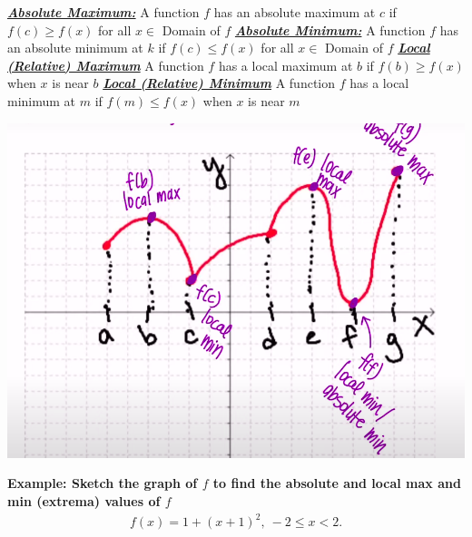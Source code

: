 \documentclass{report}
\begin{document}
    \smallbreak \noindent
    \begin{mdframed}
      \textbf{\textit{\underline{Absolute Maximum:}}}
      A function $f$ has an absolute maximum at  $c$ if $f(c) \geq f(x)$ for all $x \in$ Domain of $f$
      \bigbreak \noindent 
      \textbf{\textit{\underline{Absolute Minimum:}}}
      A function $f$ has an absolute minimum at $k$ if  $f(c) \leq f(x)$ for all  $x \in$ Domain of  $f$
       \bigbreak \noindent 
      \textbf{\textit{\underline{Local (Relative) Maximum}}}
      A function $f$ has a local maximum at  $b$ if  $f(b) \geq f(x)$ when  $x$ is near  $b$
      \bigbreak \noindent 
      \textbf{\textit{\underline{Local (Relative) Minimum}}}
      A function $f$ has a local minimum at  $m$ if  $f(m) \leq f(x)$ when  $x$ is near  $m$
    \end{mdframed}

    \bigbreak \noindent 
    \begin{center}
      \includegraphics[scale=0.5]{ ./images/1.png }
    \end{center}

    \bigbreak \noindent 

    \bigbreak \noindent 
    \begin{mdframed}
      \textbf{Example: Sketch the graph of $f$ to find the absolute and local max and min (extrema) values of $f$}
      \begin{align*}
        f(x) = 1+(x+1)^{2},\ -2\leq x < 2
      .\end{align*}
    \end{mdframed}
\end{document}
